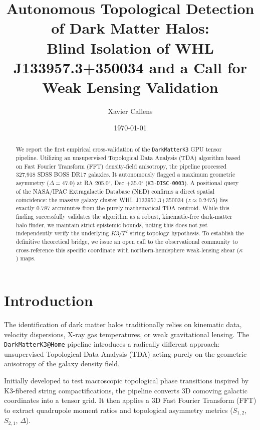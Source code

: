 \documentclass[aps,prd,twocolumn,nofootinbib,superscriptaddress,10pt]{revtex4-2}
\begin{document}
\title{Autonomous Topological Detection of Dark Matter Halos: \\ Blind Isolation of WHL J133957.3+350034 and a Call for Weak Lensing Validation}

\author{Xavier Callens}

\date{\today}

\begin{abstract}
We report the first empirical cross-validation of the \texttt{DarkMatterK3} GPU tensor pipeline. Utilizing an unsupervised Topological Data Analysis (TDA) algorithm based on Fast Fourier Transform (FFT) density-field anisotropy, the pipeline processed 327,918 SDSS BOSS DR17 galaxies. It autonomously flagged a maximum geometric asymmetry ($\Delta = 47.0$) at RA 205.0$^\circ$, Dec +35.0$^\circ$ (\texttt{K3-DISC-0003}). A positional query of the NASA/IPAC Extragalactic Database (NED) confirms a direct spatial coincidence: the massive galaxy cluster WHL J133957.3+350034 ($z \approx 0.2475$) lies exactly 0.787 arcminutes from the purely mathematical TDA centroid. While this finding successfully validates the algorithm as a robust, kinematic-free dark-matter halo finder, we maintain strict epistemic bounds, noting this does not yet independently verify the underlying $K3/T^2$ string topology hypothesis. To establish the definitive theoretical bridge, we issue an open call to the observational community to cross-reference this specific coordinate with northern-hemisphere weak-lensing shear ($\kappa$) maps.
\end{abstract}

\maketitle

\section{Introduction}

The identification of dark matter halos traditionally relies on kinematic data, velocity dispersions, X-ray gas temperatures, or weak gravitational lensing. The \texttt{DarkMatterK3@Home} pipeline introduces a radically different approach: unsupervised Topological Data Analysis (TDA) acting purely on the geometric anisotropy of the galaxy density field.

Initially developed to test macroscopic topological phase transitions inspired by K3-fibered string compactifications, the pipeline converts 3D comoving galactic coordinates into a tensor grid. It then applies a 3D Fast Fourier Transform (FFT) to extract quadrupole moment ratios and topological asymmetry metrics ($S_{1,2}$, $S_{2,1}$, $\Delta$). 
\end{document}
